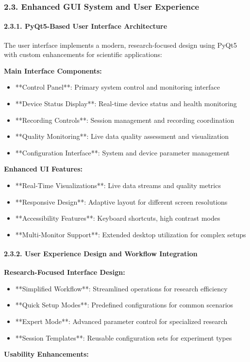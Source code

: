 \documentclass[11pt,a4paper]{article}
\begin{document}
\subsubsection{2.3. Enhanced GUI System and User Experience}

\paragraph{2.3.1. PyQt5-Based User Interface Architecture}

The user interface implements a modern, research-focused design using PyQt5 with custom enhancements for scientific
applications:

\textbf{Main Interface Components:}

\begin{itemize}
\item **Control Panel**: Primary system control and monitoring interface
\item **Device Status Display**: Real-time device status and health monitoring
\item **Recording Controls**: Session management and recording coordination
\item **Quality Monitoring**: Live data quality assessment and visualization
\item **Configuration Interface**: System and device parameter management

\end{itemize}
\textbf{Enhanced UI Features:}

\begin{itemize}
\item **Real-Time Visualizations**: Live data streams and quality metrics
\item **Responsive Design**: Adaptive layout for different screen resolutions
\item **Accessibility Features**: Keyboard shortcuts, high contrast modes
\item **Multi-Monitor Support**: Extended desktop utilization for complex setups

\end{itemize}
\paragraph{2.3.2. User Experience Design and Workflow Integration}

\textbf{Research-Focused Interface Design:}

\begin{itemize}
\item **Simplified Workflow**: Streamlined operations for research efficiency
\item **Quick Setup Modes**: Predefined configurations for common scenarios
\item **Expert Mode**: Advanced parameter control for specialized research
\item **Session Templates**: Reusable configuration sets for experiment types

\end{itemize}
\textbf{Usability Enhancements:}
\end{document}
